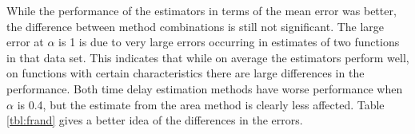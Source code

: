 \documentclass[a4paper,11pt,twoside]{article}
\begin{document}
    While the performance of the estimators in terms of the mean error was
    better, the difference between method combinations is still not
    significant. The large error at $\alpha$ is 1 is due to very large errors
    occurring in estimates of two functions in that data set. This indicates
    that while on average the estimators perform well, on functions with certain
    characteristics there are large differences in the performance. Both time
    delay estimation methods have worse performance when $\alpha$ is 0.4, but
    the estimate from the area method is clearly less affected. Table
    \ref{tbl:frand} gives a better idea of the differences in the errors.

    \begin{figure}[h!]
    \\
\end{figure}
\end{document}
